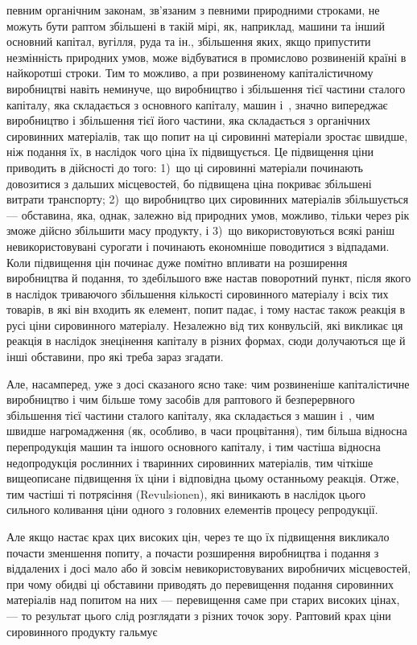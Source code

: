 \parcont{}  %
певним органічним законам, зв’язаним з певними природними
строками, не можуть бути раптом збільшені в такій мірі, як,
наприклад, машини та інший основний капітал, вугілля, руда
та ін., збільшення яких, якщо припустити незмінність природних
умов, може відбуватися в промислово розвиненій країні
в найкоротші строки. Тим то можливо, а при розвиненому капіталістичному
виробництві навіть неминуче, що виробництво і
збільшення тієї частини сталого капіталу, яка складається з
основного капіталу, машин і~, значно випереджає виробництво
і збільшення тієї його частини, яка складається з органічних
сировинних матеріалів, так що попит на ці сировинні матеріали
зростає швидше, ніж подання їх, в наслідок чого ціна їх підвищується.
Це підвищення ціни приводить в дійсності до того:
1)~що ці сировинні матеріали починають довозитися з дальших
місцевостей, бо підвищена ціна покриває збільшені витрати транспорту;
2)~що виробництво цих сировинних матеріалів збільшується
— обставина, яка, однак, залежно від природних умов,
можливо, тільки через рік зможе дійсно збільшити масу продукту,
і 3)~що використовуються всякі раніш невикористовувані
сурогати і починають економніше поводитися з відпадами. Коли
підвищення цін починає дуже помітно впливати на розширення
виробництва й подання, то здебільшого вже настав поворотний
пункт, після якого в наслідок триваючого збільшення кількості
сировинного матеріалу і всіх тих товарів, в які він входить як
елемент, попит падає, і тому настає також реакція в русі ціни
сировинного матеріалу. Незалежно від тих конвульсій, які викликає
ця реакція в наслідок знецінення капіталу в різних формах,
сюди долучаються ще й інші обставини, про які треба
зараз згадати.

Але, насамперед, уже з досі сказаного ясно таке: чим розвиненіше
капіталістичне виробництво і чим більше тому засобів
для раптового й безперервного збільшення тієї частини
сталого капіталу, яка складається з машин і~, чим швидше нагромадження
(як, особливо, в часи процвітання), тим більша відносна
перепродукція машин та іншого основного капіталу, і тим
частіша відносна недопродукція рослинних і тваринних сировинних
матеріалів, тим чіткіше вищеописане підвищення їх ціни і відповідна
цьому останньому реакція. Отже, тим частіші ті потрясіння
(Revulsionen), які виникають в наслідок цього сильного коливання
ціни одного з головних елементів процесу репродукції.

Але якщо настає крах цих високих цін, через те що їх підвищення
викликало почасти зменшення попиту, а почасти розширення
виробництва і подання з віддалених і досі мало або
й зовсім невикористовуваних виробничих місцевостей, при чому
обидві ці обставини приводять до перевищення подання сировинних
матеріалів над попитом на них — перевищення саме при старих
високих цінах, — то результат цього слід розглядати з різних
точок зору. Раптовий крах ціни сировинного продукту гальмує
\parbreak{}  %
